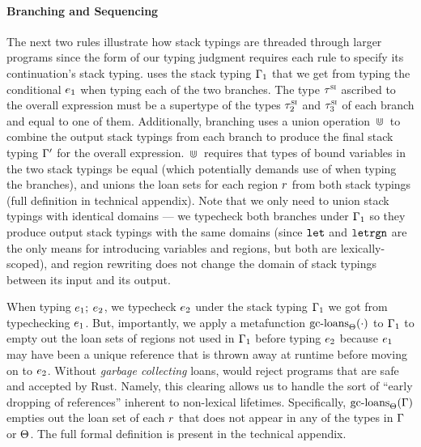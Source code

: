 \paragraph{Branching and Sequencing} The next two rules illustrate how stack
typings are threaded through larger programs since the form of our typing
judgment requires each rule to specify its continuation's stack typing.
 uses the stack typing $\Gamma_1$ that we get from typing
the conditional $e_1$ when typing each of the two branches. The type
$\tau^\textsc{si}$ ascribed to the overall expression must be a supertype of the types
$\tau^\textsc{si}_2$ and $\tau^\textsc{si}_3$ of each branch and equal to one of them.
Additionally, branching uses a union operation $\, \Cup \,$ to combine the
output stack typings from each branch to produce the final stack typing
$\Gamma^{\prime}$ for the overall expression. $\, \Cup \,$ requires that
types of bound variables in the two stack typings be equal (which potentially
demands use of  when typing the branches), and unions the loan
sets for each region $r$ from both stack typings (full definition in
technical appendix). Note that we only need to union stack typings with
identical domains --- we typecheck both branches under $\Gamma_1$ so they
produce output stack typings with the same domains (since $\mathtt{let}$ and
$\mathtt{letrgn}$ are the only means for introducing variables and regions, but
both are lexically-scoped), and region rewriting does not change the domain of
stack typings between its input and its output.

When typing $e_1 ; \: e_2$, we typecheck $e_2$ under the
stack typing $\Gamma_1$ we got from typechecking $e_1$. But,
importantly, we apply a metafunction $\textrm{gc-loans}_{\Theta}(\cdot)$ to
$\Gamma_1$ to empty out the loan sets of regions not used in $\Gamma_1$
before typing $e_2$ because $e_1$ may have been a unique reference
that is thrown away at runtime before moving on to $e_2$. Without
\emph{garbage collecting} loans, \lang would reject programs that are safe and
accepted by Rust. Namely, this clearing allows us to handle the sort of ``early
dropping of references'' inherent to non-lexical lifetimes. Specifically,
$\textrm{gc-loans}_{\Theta}(\Gamma)$ empties out the loan set of each $r$
that does not appear in any of the types in $\Gamma$ or $\Theta$. The
full formal definition is present in the technical appendix.

